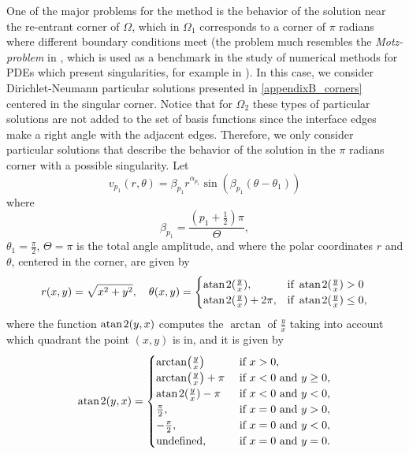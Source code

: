 One of the major problems for the method is the behavior of the solution near the re-entrant corner of \(\Omega\), which in \(\Omega_1\) corresponds to a corner of \(\pi\) radians where different boundary conditions meet (the problem much resembles the \textit{Motz-problem} in \cite{motz1947treatment}, which is used as a benchmark in the study of numerical methods for \acp{PDE} which present singularities, for example in \cite{antunes2010meshfree}).
In this case, we consider Dirichlet-Neumann particular solutions presented in \ref{appendixB_corners} centered in the singular corner. Notice that for \(\Omega_2\) these types of particular solutions are not added to the set of basis functions since the interface edges make a right angle with the adjacent edges.
Therefore, we only consider particular solutions that describe the behavior of the solution in the \(\pi\) radians corner with a possible singularity. Let
\begin{equation}\label{pat_sol_L_shape_rect}
    v_{p_1}(r, \theta) = \beta_{p_1} r^{\alpha_{p_1}} \sin(\beta_{p_1}(\theta - \theta_1))
\end{equation}
where
\[
    \beta_{p_1} = \frac{(p_1+\frac{1}{2})\pi}{\Theta},
\]
\(\theta_1 = \frac{\pi}{2}\), \(\Theta = \pi\) is the total angle amplitude, and where the polar coordinates \(r\) and \(\theta\), centered in the corner, are given by
\[
    r(x,y) = \sqrt{x^2+y^2}, \quad \theta(x,y)=\begin{cases}
        \operatorname{atan \mspace{2mu} 2}(\frac{y}{x}),& \text{if } \operatorname{atan \mspace{2mu} 2}(\frac{y}{x})>0\\
        \operatorname{atan \mspace{2mu} 2}(\frac{y}{x})+2\pi,& \text{if } \operatorname{atan \mspace{2mu} 2}(\frac{y}{x})\leq0,
    \end{cases}
\]
where the function \(\operatorname{atan \mspace{2mu} 2}(y,x)\) computes the \(\arctan\) of \(\frac{y}{x}\) taking into account which quadrant the point \((x, y)\) is in, and it is given by
\[
    \operatorname{atan \mspace{2mu} 2}(y, x) = \begin{cases}
        \arctan(\frac{y}{x}) &\text{ if } x >0,\\
        \arctan(\frac{y}{x}) + \pi &\text{ if } x < 0 \text{ and } y \geq 0,\\
        \operatorname{atan \mspace{2mu} 2}(\frac{y}{x}) -\pi &\text{ if } x < 0 \text{ and } y < 0,\\
        \frac{\pi}{2}, &\text{ if } x = 0 \text{ and } y > 0, \\
        -\frac{\pi}{2}, &\text{ if } x = 0 \text{ and } y < 0, \\
        \text{undefined}, &\text{ if } x = 0 \text{ and } y = 0.
    \end{cases}
\]
